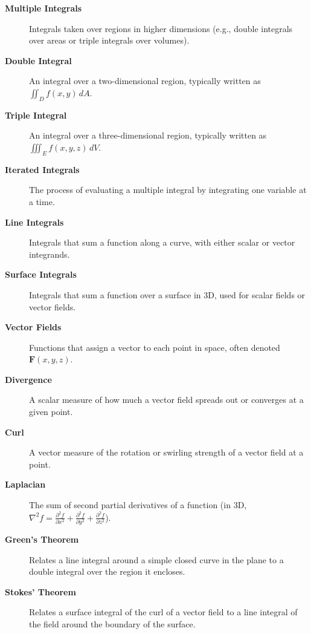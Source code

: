 \begin{description}
  \item[\textbf{Multiple Integrals}] Integrals taken over regions in higher dimensions (e.g., double integrals over areas or triple integrals over volumes).

  \item[\textbf{Double Integral}] An integral over a two-dimensional region, typically written as $\iint_{D} f(x,y)\, dA$.

  \item[\textbf{Triple Integral}] An integral over a three-dimensional region, typically written as $\iiint_{E} f(x,y,z)\, dV$.

  \item[\textbf{Iterated Integrals}] The process of evaluating a multiple integral by integrating one variable at a time.

  \item[\textbf{Line Integrals}] Integrals that sum a function along a curve, with either scalar or vector integrands.

  \item[\textbf{Surface Integrals}] Integrals that sum a function over a surface in 3D, used for scalar fields or vector fields.

  \item[\textbf{Vector Fields}] Functions that assign a vector to each point in space, often denoted $\mathbf{F}(x,y,z)$.

  \item[\textbf{Divergence}] A scalar measure of how much a vector field spreads out or converges at a given point.

  \item[\textbf{Curl}] A vector measure of the rotation or swirling strength of a vector field at a point.

  \item[\textbf{Laplacian}] The sum of second partial derivatives of a function (in 3D, $\nabla^2 f = \frac{\partial^2 f}{\partial x^2} + \frac{\partial^2 f}{\partial y^2} + \frac{\partial^2 f}{\partial z^2}$).

  \item[\textbf{Green's Theorem}] Relates a line integral around a simple closed curve in the plane to a double integral over the region it encloses.

  \item[\textbf{Stokes' Theorem}] Relates a surface integral of the curl of a vector field to a line integral of the field around the boundary of the surface.


\end{description}
